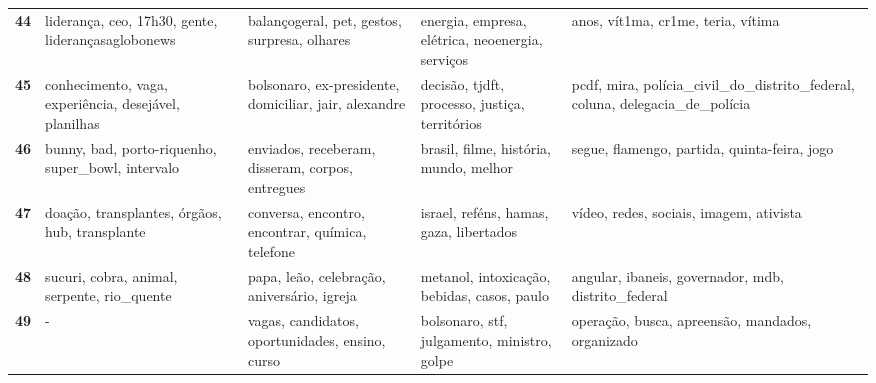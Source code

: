 \begin{xltabular}{\textwidth}{@{}l >{\RaggedRight\arraybackslash}X >{\RaggedRight\arraybackslash}X >{\RaggedRight\arraybackslash}X >{\RaggedRight\arraybackslash}X@{}}
    \textbf{44} & liderança, ceo, 17h30, gente, liderançasaglobonews & balançogeral, pet, gestos, surpresa, olhares & energia, empresa, elétrica, neoenergia, serviços & anos, vít1ma, cr1me, teria, vítima \\
    \textbf{45} & conhecimento, vaga, experiência, desejável, planilhas & bolsonaro, ex-presidente, domiciliar, jair, alexandre & decisão, tjdft, processo, justiça, territórios & pcdf, mira, polícia\_civil\_do\_distrito\_federal, coluna, delegacia\_de\_polícia \\
    \textbf{46} & bunny, bad, porto-riquenho, super\_bowl, intervalo & enviados, receberam, disseram, corpos, entregues & brasil, filme, história, mundo, melhor & segue, flamengo, partida, quinta-feira, jogo \\
    \textbf{47} & doação, transplantes, órgãos, hub, transplante & conversa, encontro, encontrar, química, telefone & israel, reféns, hamas, gaza, libertados & vídeo, redes, sociais, imagem, ativista \\
    \textbf{48} & sucuri, cobra, animal, serpente, rio\_quente & papa, leão, celebração, aniversário, igreja & metanol, intoxicação, bebidas, casos, paulo & angular, ibaneis, governador, mdb, distrito\_federal \\
    \textbf{49} & - & vagas, candidatos, oportunidades, ensino, curso & bolsonaro, stf, julgamento, ministro, golpe & operação, busca, apreensão, mandados, organizado \\
\end{xltabular}
\endgroup
